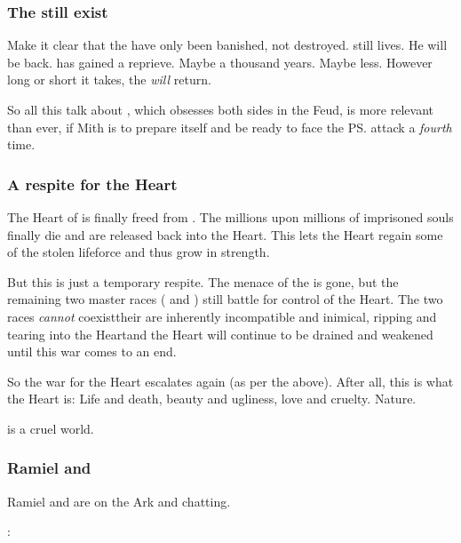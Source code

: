 \begin{garbage}
\subsubsection{The \banes{} still exist}
Make it clear that the \banes{} have only been banished, not destroyed. 
\Daggerrain{} still lives. 
He will be back. 
\Miith{} has gained a reprieve. 
Maybe a thousand years. 
Maybe less.
However long or short it takes, the \banes{} \emph{will} return. 

So all this talk about , which obsesses both sides in the Feud, is more relevant than ever, if Mith is to prepare itself and be ready to face the \ps{\Voidbringer} attack a \emph{fourth} time. 






\subsubsection{A respite for the Heart}
The Heart of \Miith{} is finally freed from . 
The millions upon millions of imprisoned souls finally die and are released back into the Heart. 
This lets the Heart regain some of the stolen lifeforce and thus grow in strength. 

But this is just a temporary respite. 
The menace of the \banes{} is gone, but the remaining two master races (\dragons{} and \resphain) still battle for control of the Heart. 
The two races \emph{cannot} coexist\dash their \matrices{} are inherently incompatible and inimical, ripping and tearing into the Heart\dash and the Heart will continue to be drained and weakened until this war comes to an end. 

So the war for the Heart escalates again (as per the  above). 
After all, this is what the Heart is: 
Life and death, beauty and ugliness, love and cruelty. 
Nature. 

\Miith{} is a cruel world. 





\subsubsection{Ramiel and \Ishnaruchaefir}
Ramiel and \Ishnaruchaefir{} are on the Ark and chatting. 

\begin{prose}
  \Ishnaruchaefir:
  

\end{prose}
\end{garbage}
